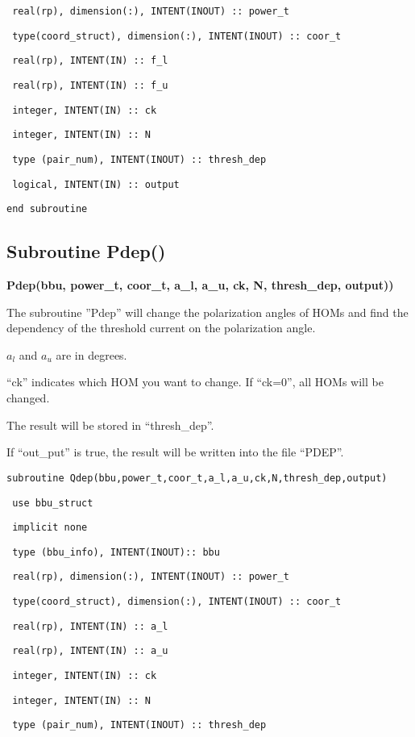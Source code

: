 \documentclass[12pt]{article}
\begin{document}
\texttt{    real(rp), dimension(:), INTENT(INOUT) :: power\_t}

\texttt{    type(coord\_struct), dimension(:), INTENT(INOUT) :: coor\_t}

\texttt{    real(rp), INTENT(IN) :: f\_l}

\texttt{    real(rp), INTENT(IN) :: f\_u}

\texttt{    integer, INTENT(IN) :: ck}

\texttt{    integer, INTENT(IN) :: N}

\texttt{    type (pair\_num), INTENT(INOUT) :: thresh\_dep}

\texttt{    logical, INTENT(IN) :: output}

\texttt{end subroutine}
\subsection{Subroutine Pdep()}
{\bf Pdep(bbu, power\_t, coor\_t, a\_l, a\_u, ck, N, thresh\_dep, output))}

The subroutine ''Pdep'' will change the polarization angles of HOMs and find the dependency of the threshold current on the polarization angle.

$a_l$ and $a_u$ are in degrees.

``ck'' indicates which HOM you want to change. If ``ck=0'', all HOMs will be changed.

The result will be stored in ``thresh\_dep''.

If ``out\_put'' is true, the result will be written into the file ``PDEP''.

\texttt{subroutine Qdep(bbu,power\_t,coor\_t,a\_l,a\_u,ck,N,thresh\_dep,output)}

\texttt{    use bbu\_struct}

\texttt{    implicit none}

\texttt{    type (bbu\_info), INTENT(INOUT):: bbu}

\texttt{    real(rp), dimension(:), INTENT(INOUT) :: power\_t}

\texttt{    type(coord\_struct), dimension(:), INTENT(INOUT) :: coor\_t}

\texttt{    real(rp), INTENT(IN) :: a\_l}

\texttt{    real(rp), INTENT(IN) :: a\_u}

\texttt{    integer, INTENT(IN) :: ck}

\texttt{    integer, INTENT(IN) :: N}

\texttt{    type (pair\_num), INTENT(INOUT) :: thresh\_dep}
\end{document}

